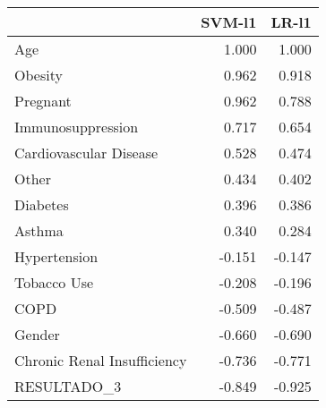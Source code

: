\begin{tabular}{lrr}
\toprule
{} &  SVM-l1 &  LR-l1 \\
\midrule
Age                         &   1.000 &  1.000 \\
Obesity                     &   0.962 &  0.918 \\
Pregnant                    &   0.962 &  0.788 \\
Immunosuppression           &   0.717 &  0.654 \\
Cardiovascular Disease      &   0.528 &  0.474 \\
Other                       &   0.434 &  0.402 \\
Diabetes                    &   0.396 &  0.386 \\
Asthma                      &   0.340 &  0.284 \\
Hypertension                &  -0.151 & -0.147 \\
Tobacco Use                 &  -0.208 & -0.196 \\
COPD                        &  -0.509 & -0.487 \\
Gender                      &  -0.660 & -0.690 \\
Chronic Renal Insufficiency &  -0.736 & -0.771 \\
RESULTADO\_3                 &  -0.849 & -0.925 \\
\bottomrule
\end{tabular}
